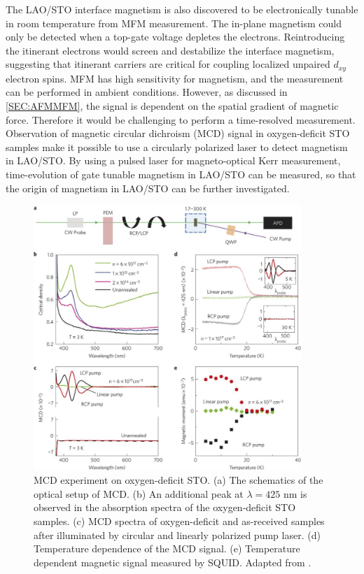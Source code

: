 \documentclass[pdflatex, sectionletters, 12pt]{pittetd}    %
\begin{document}
The LAO/STO interface magnetism is also discovered to be electronically tunable in room temperature from MFM measurement\cite{bi2014room}. The in-plane magnetism could only be detected when a top-gate voltage depletes the electrons. Reintroducing the itinerant electrons would screen and destabilize the interface magnetism, suggesting that itinerant carriers are critical for coupling localized unpaired $d_{xy}$ electron spins\cite{fidkowski2013magnetic, Joshua2013gate, banerjee2013ferromagnetic}. MFM has high sensitivity for magnetism, and the measurement can be performed in ambient conditions. However, as discussed in \ref{SEC:AFMMFM}, the signal is dependent on the spatial gradient of magnetic force. Therefore it would be challenging to perform a time-resolved measurement. Observation of magnetic circular dichroism (MCD) signal in oxygen-deficit STO samples\cite{rice2014persistent} make it possible to use a circularly polarized laser to detect magnetism in LAO/STO. By using a pulsed laser for magneto-optical Kerr measurement, time-evolution of gate tunable magnetism in LAO/STO can be measured, so that the origin of magnetism in LAO/STO can be further investigated.

\begin{figure}[p]
	\centering
	\includegraphics[width=0.9\textwidth]{Drawing/MCDRice.jpg}
	\caption{MCD experiment on oxygen-deficit STO. (a) The schematics of the optical setup of MCD. (b) An additional peak at $\lambda=425$ nm is observed in the absorption spectra of the oxygen-deficit STO samples. (c) MCD spectra of oxygen-deficit and as-received samples after illuminated by circular and linearly polarized pump laser. (d) Temperature dependence of the MCD signal. (e) Temperature dependent magnetic signal measured by SQUID. Adapted from \cite{rice2014persistent}.}
	\label{FIG:MCDRice}
\end{figure}
\end{document}
